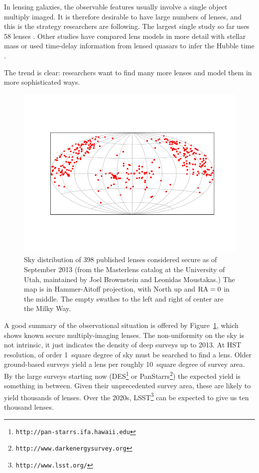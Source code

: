 \documentclass[12pt,preprint]{aastex}
\begin{document}
In lensing galaxies, the observable features usually involve a single
object multiply imaged.  It is therefore desirable to have large
numbers of lenses, and this is the strategy researchers are following.  The
largest single study so far uses 58 lenses \citep{2009ApJ...703L..51K}.
Other studies have compared lens models in more detail with stellar
mass \citep{2011ApJ...740...97L} or used time-delay information from
lensed quasars to infer the Hubble time
\citep{2008ApJ...679...17C,2010ApJ...712.1378P}.

The trend is clear: researchers want to find many more lenses and
model them in more sophisticated ways.

\begin{figure}
\centering
\includegraphics[width=.8\hsize]{fig/lenssky.png}
\caption{Sky distribution of 398 published lenses considered secure as
  of September 2013 (from the Masterlens catalog at the University of
  Utah, maintained by Joel Brownstein and Leonidas Moustakas.) The map
  is in Hammer-Aitoff projection, with North up and $\rm RA=0$ in the
  middle.  The empty swathes to the left and right of center are the
  Milky Way.}
\label{fig:masterlens}
\end{figure}

A good summary of the observational situation is offered by
Figure~\ref{fig:masterlens}, which shows known secure multiply-imaging
lenses.  The non-uniformity on the sky is not intrinsic, it just
indicates the density of deep surveys up to 2013.  At HST resolution,
of order 1~square degree of sky must be searched to find a lens.
Older ground-based surveys yield a lens per roughly 10~square degree
of survey area.  By the large surveys starting now
(DES\footnote{\tt http://pan-starrs.ifa.hawaii.edu} or
PanStarrs\footnote{\tt http://www.darkenergysurvey.org}) the expected
yield is something in between.  Given their unprecedented survey area,
these are likely to yield thousands of lenses.  Over the 2020s,
LSST\footnote{\tt http://www.lsst.org/} can be expected to give us ten
thousand lenses.
\end{document}
